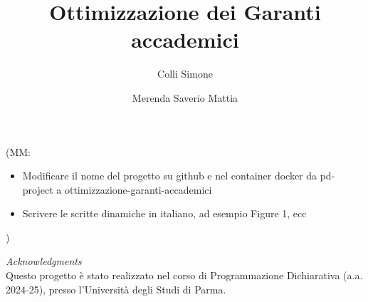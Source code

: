 \documentclass{article}
\author[1]{Colli Simone}
\author[1]{Merenda Saverio Mattia}
\affil[1]{
    \url{simone.colli@studenti.unipr.it}
    }
\affil[2]{
    \url{saveriomattia.merenda@studenti.unipr.it}
    }
\title{Ottimizzazione dei Garanti accademici}
\newcommand{\varemark}[2]{{\color{dkred}(#1: #2)}}
\newcommand{\mmerenda}[1]{\varemark{MM}{#1}}
\newcommand{\mmerenda}[1]{}
\begin{document}
\maketitle

\mmerenda{
  \begin{itemize}
    \item Modificare il nome del progetto su github e nel container docker
      da pd-project a ottimizzazione-garanti-accademici
    \item Scrivere le scritte dinamiche in italiano, ad esempio Figure 1, ecc
  \end{itemize}
}









\textit{Acknowledgments} \\Questo progetto è stato realizzato nel corso di Programmazione Dichiarativa (a.a. 2024-25), presso l'Università degli Studi di Parma.\\

\hfill

\break
\printbibliography
\end{document}
